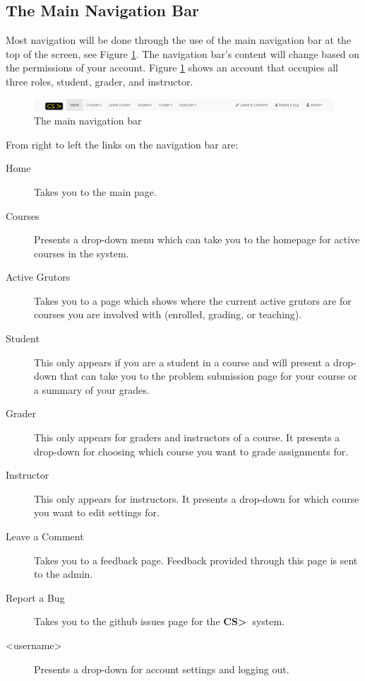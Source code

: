 \documentclass[11pt]{report}
\newcommand{\csgt}[0]{\textbf{CS\textgreater\ }}
\begin{document}
\subsection{The Main Navigation Bar}

Most navigation will be done through the use of the main navigation bar at the top of the screen, see 
Figure \ref{fig:nav_bar}. The navigation bar's content will change based on the permissions of your
account. Figure \ref{fig:nav_bar} shows an account that occupies all three roles, student, grader, and
instructor.

\begin{figure}[h]
\centering
\includegraphics[width=\textwidth,height=\textheight,keepaspectratio]{diagrams/main_header}
\caption{The main navigation bar}
\label{fig:nav_bar}
\end{figure}

From right to left the links on the navigation bar are:
\begin{description}
\item[Home] Takes you to the main page.
\item[Courses] Presents a drop-down menu which can take you to the homepage for active courses in the system.
\item[Active Grutors] Takes you to a page which shows where the current active grutors are for 
courses you are involved with (enrolled, grading, or teaching).
\item[Student] This only appears if you are a student in a course and will present a drop-down that can take
you to the problem submission page for your course or a summary of your grades.
\item[Grader] This only appears for graders and instructors of a course. It presents a drop-down for choosing
which course you want to grade assignments for.
\item[Instructor] This only appears for instructors. It presents a drop-down for which course you want to 
edit settings for.
\item[Leave a Comment] Takes you to a feedback page. Feedback provided through this page is sent to the
admin.
\item[Report a Bug] Takes you to the github issues page for the \csgt system.
\item[\textless username\textgreater] Presents a drop-down for account settings and logging out.
\end{description}
\end{document}
